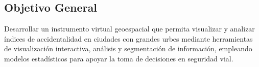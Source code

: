 \subsection{Objetivo General}
Desarrollar un instrumento virtual geoespacial que permita visualizar y analizar índices de accidentalidad en ciudades con grandes urbes mediante herramientas de visualización interactiva, análisis y segmentación de información, empleando modelos estadísticos para apoyar la toma de decisiones en seguridad vial.